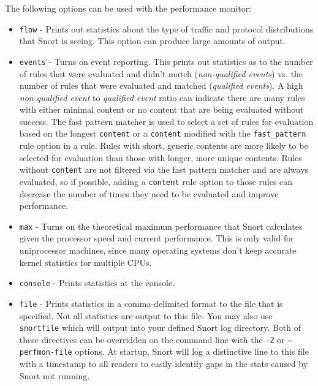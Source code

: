 \documentclass[english]{report}
\begin{document}
The following options can be used with the performance monitor:

\begin{itemize}

\item \texttt{flow} - Prints out statistics about the type of traffic and
protocol distributions that Snort is seeing. This option can produce large
amounts of output.

\item \texttt{events} - Turns on event reporting.  This prints out statistics
as to the number of rules that were evaluated and didn't match
(\textit{non-qualified events}) vs. the number of rules that were evaluated and
matched (\textit{qualified events}).  A high \textit{non-qualified event} to
\textit{qualified event} ratio can indicate there are many rules with either
minimal content or no content that are being evaluated without success.  The
fast pattern matcher is used to select a set of rules for evaluation based on
the longest \texttt{content} or a \texttt{content} modified with the
\texttt{fast\_pattern} rule option in a rule.  Rules with short, generic
contents are more likely to be selected for evaluation than those with
longer, more unique contents.  Rules without \texttt{content} are not
filtered via the fast pattern matcher and are always evaluated, so if
possible, adding a \texttt{content} rule option to those rules can decrease the
number of times they need to be evaluated and improve performance.

\item \texttt{max} - Turns on the theoretical maximum performance that Snort
calculates given the processor speed and current performance.  This is only
valid for uniprocessor machines, since many operating systems don't keep
accurate kernel statistics for multiple CPUs.  

\item \texttt{console} - Prints statistics at the console.

\item \texttt{file} - Prints statistics in a comma-delimited format to the file
that is specified.  Not all statistics are output to this file.  You may also
use \texttt{snortfile} which will output into your defined Snort log directory.
Both of these directives can be overridden on the command line with the
\texttt{-Z} or \texttt{--perfmon-file} options.  At startup, Snort will log
a distinctive line to this file with a timestamp to all readers to easily identify
gaps in the stats caused by Snort not running.


\end{itemize}
\end{document}
